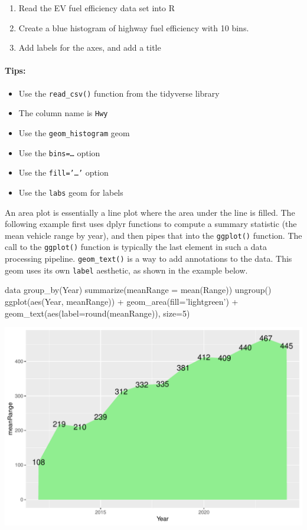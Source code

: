 \begin{exercisebox}
\begin{enumerate}
    \item Read the EV fuel efficiency data set into R
    \item Create a blue histogram of highway fuel efficiency with 10 bins.
    \item Add labels for the axes, and add a title
\end{enumerate}

\paragraph*{Tips:}
    \begin{itemize} 
		\item Use the \texttt{read\_csv()} function from the tidyverse library
       \item The column name is \texttt{Hwy}
       \item Use the \texttt{geom\_histogram} geom
       \item Use the \texttt{bins=\ldots} option
       \item Use the \texttt{fill='\ldots'} option
       \item Use the \texttt{labs} geom for labels
    \end{itemize}
\end{exercisebox}

An area plot is essentially a line plot where the area under the line is filled. The following example first uses dplyr functions to compute a summary statistic (the mean vehicle range by year), and then pipes that into the \texttt{ggplot()} function. The call to the \texttt{ggplot()} function is typically the last element in such a data processing pipeline. \texttt{geom\_text()} is a way to add annotations to the data. This geom uses its own \texttt{label} aesthetic, as shown in the example below. 

\begin{Rcode}
data %
  group_by(Year) %
  summarize(meanRange = mean(Range)) %
  ungroup() %
  ggplot(aes(Year, meanRange)) + 
    geom_area(fill='lightgreen') +
    geom_text(aes(label=round(meanRange)), size=5)
\end{Rcode}

\begin{center}
  \includegraphics[width=.8\textwidth]{fuel.areaOneSeries.pdf}
\end{center}

